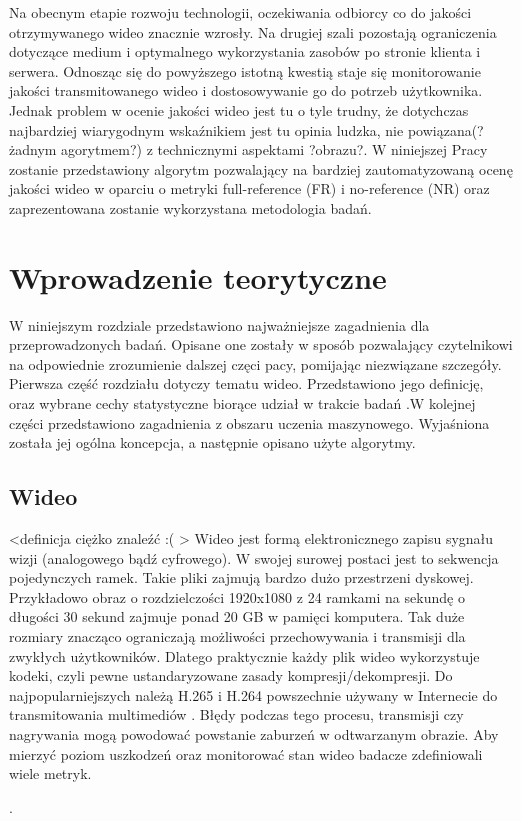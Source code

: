Na obecnym etapie rozwoju technologii, oczekiwania odbiorcy co do jakości otrzymywanego wideo znacznie wzrosły. Na drugiej szali pozostają ograniczenia dotyczące medium i optymalnego wykorzystania zasobów po stronie klienta i serwera. Odnosząc się do powyższego istotną kwestią staje się monitorowanie jakości transmitowanego wideo i dostosowywanie go do potrzeb użytkownika. Jednak problem w ocenie jakości wideo jest tu o tyle trudny, że dotychczas najbardziej wiarygodnym wskaźnikiem jest tu opinia ludzka, nie powiązana(?żadnym agorytmem?) z technicznymi aspektami ?obrazu?. W niniejszej Pracy zostanie przedstawiony algorytm pozwalający na bardziej zautomatyzowaną ocenę jakości wideo w oparciu o metryki full-reference (FR) i no-reference (NR) oraz zaprezentowana zostanie wykorzystana metodologia badań.



\chapter{Wprowadzenie teorytyczne}
\label{cha:pierwszyDokument}

W niniejszym rozdziale przedstawiono najważniejsze zagadnienia dla przeprowadzonych badań. Opisane one zostały w sposób pozwalający czytelnikowi na odpowiednie zrozumienie dalszej częci pacy, pomijając niezwiązane szczegóły. Pierwsza część rozdziału dotyczy tematu wideo. Przedstawiono jego definicję, oraz wybrane cechy statystyczne biorące udział w trakcie badań .W kolejnej części przedstawiono zagadnienia z obszaru uczenia maszynowego. Wyjaśniona została jej ogólna koncepcja, a następnie opisano użyte algorytmy.


\section{Wideo}

<definicja ciężko znaleźć :( >
Wideo jest formą elektronicznego zapisu sygnału wizji (analogowego bądź cyfrowego). W swojej surowej postaci jest to sekwencja pojedynczych ramek. Takie pliki zajmują bardzo dużo przestrzeni dyskowej. Przykładowo obraz o rozdzielczości 1920x1080 z 24 ramkami na sekundę o długości 30 sekund zajmuje ponad 20 GB w pamięci komputera. Tak duże rozmiary znacząco ograniczają możliwości przechowywania i transmisji dla zwykłych użytkowników. Dlatego praktycznie każdy plik wideo wykorzystuje kodeki, czyli pewne ustandaryzowane zasady kompresji/dekompresji. Do najpopularniejszych należą H.265 i H.264 powszechnie używany w Internecie do transmitowania multimediów \cite{video_codecs}. Błędy podczas tego procesu, transmisji czy nagrywania  mogą powodować powstanie zaburzeń w odtwarzanym obrazie. Aby mierzyć poziom uszkodzeń oraz monitorować stan wideo badacze zdefiniowali wiele metryk.\par.

